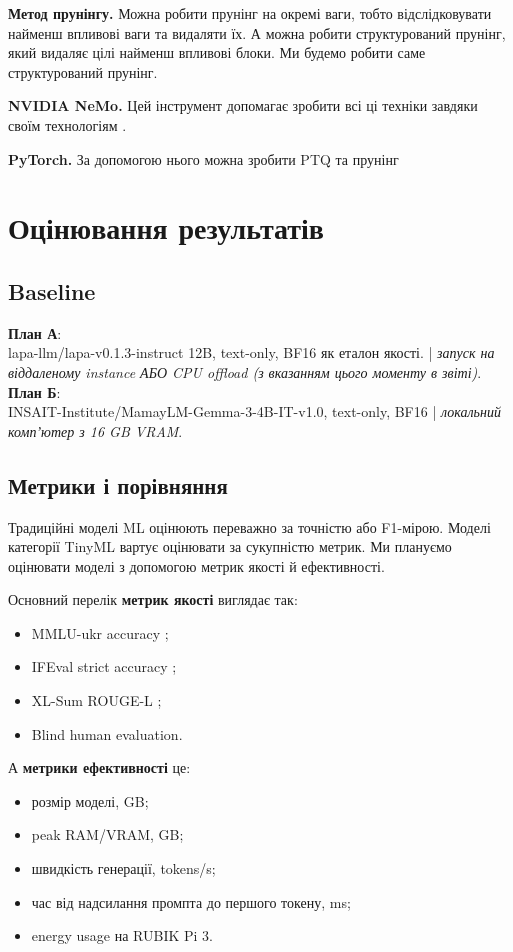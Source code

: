 \documentclass[ukrainian]{ucuproposal}
\begin{document}
\textbf{Метод прунінгу.} Можна робити прунінг на окремі ваги, тобто відслідковувати найменш впливові ваги та видаляти їх. А можна робити структурований прунінг, який видаляє цілі найменш впливові блоки. Ми будемо робити саме структурований прунінг.


\textbf{NVIDIA NeMo.} Цей інструмент допомагає зробити всі ці техніки завдяки своїм технологіям \cite{nemo}. 

\textbf{PyTorch.} За допомогою нього можна зробити PTQ \cite{quant_torch} та прунінг \cite{torch_pruning}


\section{Оцінювання результатів}
\subsection{Baseline}
\textbf{План А}:\\
lapa-llm/lapa-v0.1.3-instruct 12B, text-only, BF16 як еталон якості.\cite{lapa_llm} | \textit{запуск на віддаленому instance АБО CPU offload (з вказанням цього моменту в звіті)}.\\
\textbf{План Б}:\\
INSAIT-Institute/MamayLM-Gemma-3-4B-IT-v1.0, text-only, BF16 \cite{mamay} | \textit{локальний компʼютер з 16 GB VRAM}.
\subsection{Метрики і порівняння}
Традиційні моделі ML оцінюють переважно за точністю або F1-мірою. Моделі категорії TinyML вартує оцінювати за сукупністю метрик\cite{tiny_deep_learning}.
Ми плануємо оцінювати моделі з допомогою метрик якості й ефективності.

Основний перелік \textbf{метрик якості} виглядає так:
\begin{itemize}
    \item MMLU-ukr accuracy \cite{dataset_mmlu};
    \item IFEval strict accuracy \cite{dataset_ifeval};
    \item XL-Sum ROUGE-L \cite{rouge_l, xlsum};
     \item Blind human evaluation.
\end{itemize}
А \textbf{метрики ефективності} це:
\begin{itemize}
    \item розмір моделі, GB;
    \item peak RAM/VRAM, GB;
    \item швидкість генерації, tokens/s;
    \item час від надсилання промпта до першого токену, ms;
    \item energy usage на RUBIK Pi 3.
\end{itemize}
\end{document}
